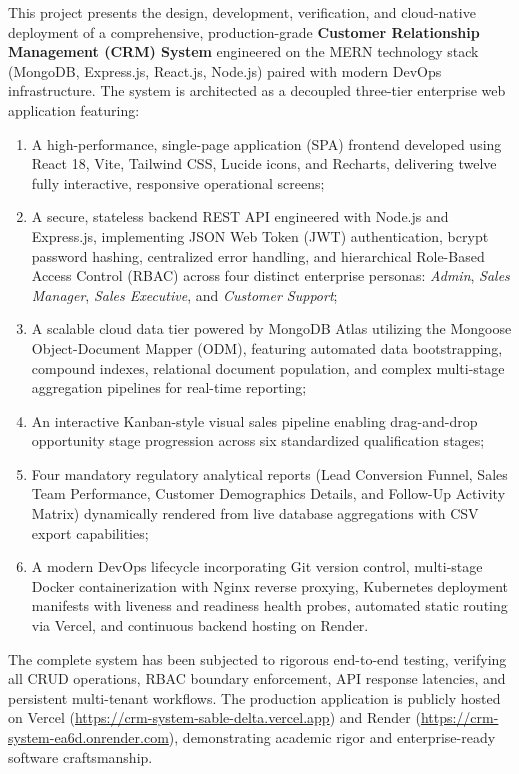 This project presents the design, development, verification, and cloud-native deployment of a comprehensive, production-grade \textbf{Customer Relationship Management (CRM) System} engineered on the MERN technology stack (MongoDB, Express.js, React.js, Node.js) paired with modern DevOps infrastructure. The system is architected as a decoupled three-tier enterprise web application featuring:
\begin{enumerate}[label=(\roman*)]
    \item A high-performance, single-page application (SPA) frontend developed using React 18, Vite, Tailwind CSS, Lucide icons, and Recharts, delivering twelve fully interactive, responsive operational screens;
    \item A secure, stateless backend REST API engineered with Node.js and Express.js, implementing JSON Web Token (JWT) authentication, bcrypt password hashing, centralized error handling, and hierarchical Role-Based Access Control (RBAC) across four distinct enterprise personas: \textit{Admin}, \textit{Sales Manager}, \textit{Sales Executive}, and \textit{Customer Support};
    \item A scalable cloud data tier powered by MongoDB Atlas utilizing the Mongoose Object-Document Mapper (ODM), featuring automated data bootstrapping, compound indexes, relational document population, and complex multi-stage aggregation pipelines for real-time reporting;
    \item An interactive Kanban-style visual sales pipeline enabling drag-and-drop opportunity stage progression across six standardized qualification stages;
    \item Four mandatory regulatory analytical reports (Lead Conversion Funnel, Sales Team Performance, Customer Demographics Details, and Follow-Up Activity Matrix) dynamically rendered from live database aggregations with CSV export capabilities;
    \item A modern DevOps lifecycle incorporating Git version control, multi-stage Docker containerization with Nginx reverse proxying, Kubernetes deployment manifests with liveness and readiness health probes, automated static routing via Vercel, and continuous backend hosting on Render.
\end{enumerate}

The complete system has been subjected to rigorous end-to-end testing, verifying all CRUD operations, RBAC boundary enforcement, API response latencies, and persistent multi-tenant workflows. The production application is publicly hosted on Vercel (\url{https://crm-system-sable-delta.vercel.app}) and Render (\url{https://crm-system-ea6d.onrender.com}), demonstrating academic rigor and enterprise-ready software craftsmanship.

